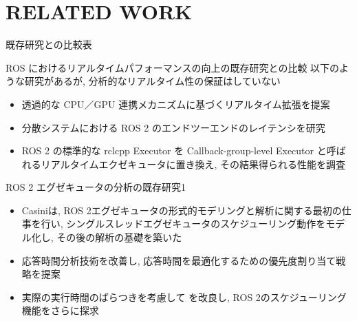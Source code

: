 
\section{RELATED WORK}
\label{sec: related work}


\begin{frame}{既存研究との比較表}
\end{frame}


\begin{frame}{ROS におけるリアルタイムパフォーマンスの向上の既存研究との比較}
    以下のような研究があるが, 分析的なリアルタイム性の保証はしていない
    \begin{itemize}
        \item 透過的な CPU／GPU 連携メカニズムに基づくリアルタイム拡張を提案 \cite{suzuki2018real}
        \item 分散システムにおける ROS 2 のエンドツーエンドのレイテンシを研究 \cite{kronauer2021latency}
        \item ROS 2 の標準的な rclcpp Executor を Callback-group-level Executor と呼ばれるリアルタイムエクゼキュータに置き換え, その結果得られる性能を調査 \cite{yang2020exploring}
    \end{itemize}
\end{frame}

\begin{frame}{ROS 2 エグゼキュータの分析の既存研究1}
    \begin{itemize}
        \item Casiniは, ROS 2エグゼキュータの形式的モデリングと解析に関する最初の仕事を行い, シングルスレッドエグゼキュータのスケジューリング動作をモデル化し, その後の解析の基礎を築いた \cite{park2021ros2}
        \item 応答時間分析技術を改善し, 応答時間を最適化するための優先度割り当て戦略を提案 \cite{tang2020response}
        \item 実際の実行時間のばらつきを考慮して \cite{park2021ros2} を改良し, ROS 2のスケジューリング機能をさらに探求 \cite{blass2021ros}
    \end{itemize}
\end{frame}

